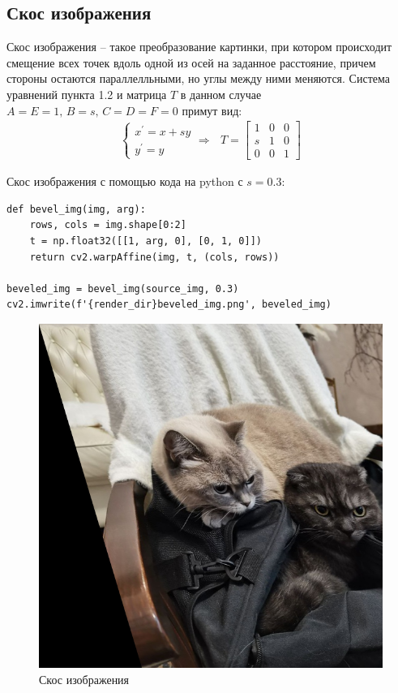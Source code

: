 \documentclass[a4paper, 16pt]{article}
\begin{document}
\subsection{Скос изображения}
\noindent Скос изображения -- такое преобразование картинки, при котором происходит
смещение всех точек вдоль одной из осей на заданное расстояние, причем стороны остаются
параллелльными, но углы между ними меняются. Система уравнений пункта 1.2 и матрица $T$
в данном случае $A=E=1,\,B=s,\,C=D=F=0$ примут вид:
\begin{align*}
    \begin{cases}
        x^{\prime}=x+sy\\
        y^{\prime}=y
    \end{cases}\Rightarrow\,\,\,\,
    T=
    \begin{bmatrix}
        1 &0 &0\\
        s &1 &0\\
        0 &0 &1
    \end{bmatrix}
\end{align*}


\newpage
\noindent Скос изображения с помощью кода на python с $s=0.3$:
\begin{lstlisting}[label=bevel-code,caption=Код для скоса изображения]
def bevel_img(img, arg):
    rows, cols = img.shape[0:2]
    t = np.float32([[1, arg, 0], [0, 1, 0]])
    return cv2.warpAffine(img, t, (cols, rows))

beveled_img = bevel_img(source_img, 0.3)
cv2.imwrite(f'{render_dir}beveled_img.png', beveled_img)
\end{lstlisting}


\begin{figure}[!htb]
    \centering
    \includegraphics[scale=0.3]{beveled_img.png}
    \captionsetup{skip=0pt}
    \caption{Скос изображения}
    \label{Рис:10}
\end{figure}
\end{document}
